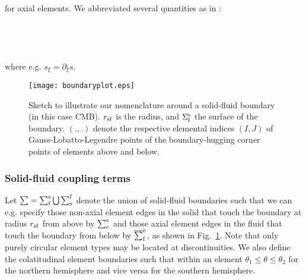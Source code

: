 %
\eqa \label{eq:scheme_wu_ax}
 \nonumber\\
\ena
%
for axial elements. We abbreviated several quantities as 
in \citet[][Table~1]{nissen+:07b}:
%
\eqa
{}\nonumber\\
\nonumber\\
\nonumber\\
\nonumber\\
\nonumber\\
\nonumber
\ena
%
where e.g. $s_\xi=\partial_\xi s$.
% 
\begin{figure}[b!]
\begin{center}
\texttt{[image: boundaryplot.eps]}
\caption{Sketch to illustrate our nomenclature around a solid-fluid boundary 
(in this case CMB). $r_{\rm sf}$ is the radius, and $\Sigma_{\rm f}^{\rm s}$ 
the surface of the boundary. $(.,.)$ denote the respective elemental indices 
$(I,J)$ of Gauss-Lobatto-Legendre points of the boundary-hugging corner 
points of elements above and below.}
\label{img:bdry}
\end{center}
\end{figure}
%
\subsubsection{Solid-fluid coupling terms}
%
Let $\sum=\sum^{\rm s}_{\rm f}\bigcup\sum^{\rm f}_{\rm s}$ denote the union 
of solid-fluid boundaries such that we can e.g. specify those non-axial 
element edges in the solid that touch the boundary at radius $r_{\rm sf}$ 
from above by $\sum^{\rm s}_e$ and those axial element edges in the fluid that 
touch the boundary from below by $\overline{\sum}_{\rm f}^e$, as shown in 
Fig.~\ref{img:bdry}. Note that only purely circular element types 
\citep[see][Appendix~A]{nissen+:07b} may be located at 
discontinuities.
We also define the colatitudinal element boundaries such that within an element
$\theta_1\leq\theta\leq\theta_2$ for the northern hemisphere and vice versa 
for the southern hemisphere. 

